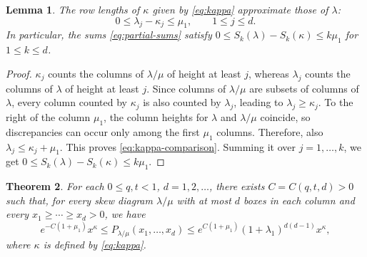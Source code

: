 \documentclass[11pt,reqno]{amsart}
\newtheorem{theorem}{Theorem}[section]
\newtheorem{lemma}[theorem]{Lemma}
\theoremstyle{definition}
\theoremstyle{remark}
\numberwithin{equation}{section}
\begin{document}
\begin{lemma} \label{Lemma_S_kappa}
 The row lengths of $\kappa$ given by \eqref{eq:kappa} approximate those of $\lambda$:
\begin{equation}\label{eq:kappa-comparison}
 0\le\lambda_j-\kappa_j\le\mu_1,\qquad 1\le j\le d.
\end{equation}
In particular, the sums \eqref{eq:partial-sums} satisfy $0\le S_k(\lambda)-S_k(\kappa)\le k\mu_1$ for
$1\le k\le d$.
\end{lemma}
\begin{proof}
$\kappa_j$ counts the columns of $\lambda/\mu$ of height
at least $j$, whereas $\lambda_j$ counts the columns of $\lambda$
of height at least $j$. Since columns of $\lambda/\mu$ are subsets of columns of $\lambda$, every column counted by $\kappa_j$ is also counted
by $\lambda_j$, leading to $\lambda_j\ge \kappa_j$. To the right of the column $\mu_1$, the column heights for $\lambda$ and $\lambda/\mu$
coincide, so discrepancies can occur only among the first $\mu_1$
columns. Therefore, also $\lambda_j\le \kappa_j+\mu_1$. This proves \eqref{eq:kappa-comparison}. Summing it over
$j=1,\ldots,k$, we get $0\le S_k(\lambda)-S_k(\kappa)\le k\mu_1$. 
\end{proof}

\begin{theorem}\label{Theorem_monomial_localization}
For each $0\le q,t<1$, $d=1,2,\dots$, there exists $C=C(q,t,d)>0$ such that, for every skew
diagram $\lambda/\mu$ with at most $d$ boxes in each column and every
$x_1\ge\cdots\ge x_d>0$, we have
\begin{equation}\label{eq:localization}
 e^{-C(1+\mu_1)}x^\kappa
 \le P_{\lambda/\mu}(x_1,\ldots,x_d)
 \le e^{C(1+\mu_1)} (1+\lambda_1)^{d(d-1)}x^\kappa,
\end{equation}
where $\kappa$ is defined by \eqref{eq:kappa}.
\end{theorem}
\end{document}
